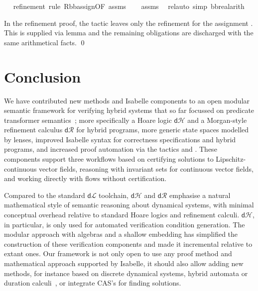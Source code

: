 \documentclass[envcountsame,envcountsect]{llncs}
\newcommand{\dL}{\mathsf{d}\mathcal{L}}
\newcommand{\dH}{\mathsf{d}\mathcal{H}}
\newcommand{\dR}{\mathsf{d}\mathcal{R}}
\begin{document}
\begin{example}
\begin{isabellebody}
\ \ \isamarkupfalse%
{\isacharparenleft}refinement{\isacharsemicolon}\ {\isacharparenleft}rule\ R{\isacharunderscore}bb{\isacharunderscore}assign{\isacharbrackleft}OF\ assms{\isacharbrackright}{\isacharparenright}{\isacharquery}{\isacharparenright}\isanewline
\ \ \isamarkupfalse%
\ assms\ \isamarkupfalse%
\ {\isacharparenleft}rel{\isacharunderscore}auto{\isacharprime}\ simp{\isacharcolon}\ bb{\isacharunderscore}real{\isacharunderscore}arith{\isacharparenright}\isanewline
\end{isabellebody}
\noindent %
In the
refinement proof, the tactic leaves only the refinement for the
assignment . This is supplied via lemma
 and the
remaining obligations are discharged with the same arithmetical
facts. \qed
\end{example}


\section{Conclusion}\label{sec:conclusion}

We have contributed new methods and Isabelle components to an open
modular semantic framework for verifying hybrid systems that so far
focussed on predicate transformer semantics~\cite{MuniveS19}; more
specifically a Hoare logic $\dH$ and a Morgan-style refinement
calculus $\dR$ for hybrid programs, more generic state spaces modelled
by lenses, improved Isabelle syntax for correctness specifications and
hybrid programs, and increased proof automation via the tactics
 and .  These components support three
workflows based on certifying solutions to Lipschitz-continuous vector
fields, reasoning with invariant sets for continuous vector fields,
and working directly with flows without certification.

Compared to the standard $\dL$ toolchain, $\dH$ and $\dR$ emphasise a
natural mathematical style of semantic reasoning about dynamical
systems, with minimal conceptual overhead relative to standard Hoare
logics and refinement calculi. $\dH$, in particular, is only used for
automated verification condition generation. The modular approach with
algebras and a shallow embedding has simplified the construction of
these verification components and made it incremental relative to
extant ones. Our framework is not only open to use any proof method
and mathematical approach supported by Isabelle, it should also allow
adding new methods, for instance based on discrete dynamical systems,
hybrid automata or duration calculi~\cite{LiuLQZZZZ10,Foster19b-HybridRelations}, or integrate
CAS's for finding solutions.
\end{document}

